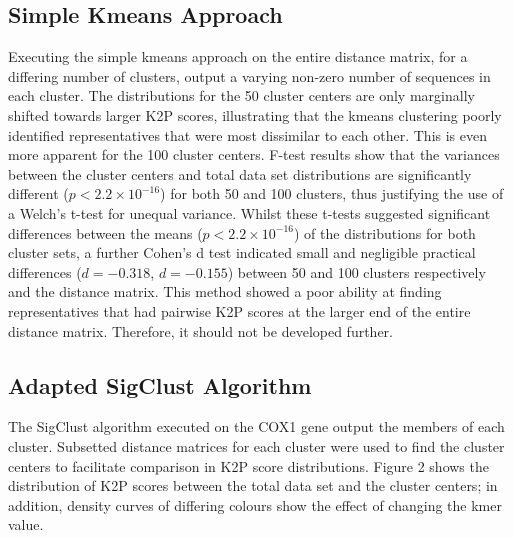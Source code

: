 \documentclass[12pt]{article}
\begin{document}
  \subsection{Simple Kmeans Approach}

  Executing the simple kmeans approach on the entire distance matrix, for a differing number of clusters, output a varying non-zero number of sequences in each cluster. The distributions for the 50 cluster centers are only marginally shifted towards larger K2P scores, illustrating that the kmeans clustering poorly identified representatives that were most dissimilar to each other. This is even more apparent for the 100 cluster centers. F-test results show that the variances between the cluster centers and total data set distributions are significantly different ($p < 2.2 \times 10^{-16}$) for both 50 and 100 clusters, thus justifying the use of a Welch's t-test for unequal variance. Whilst these t-tests suggested significant differences between the means ($p < 2.2 \times 10^{-16}$) of the distributions for both cluster sets, a further Cohen's d test indicated small and negligible practical differences ($d = -0.318$, $d = -0.155$) between 50 and 100 clusters respectively and the distance matrix. This method showed a poor ability at finding representatives that had pairwise K2P scores at the larger end of the entire distance matrix. Therefore, it should not be developed further.

  \subsection{Adapted SigClust Algorithm}

  The SigClust algorithm executed on the COX1 gene output the members of each cluster. Subsetted distance matrices for each cluster were used to find the cluster centers to facilitate comparison in K2P score distributions. Figure 2 shows the distribution of K2P scores between the total data set and the cluster centers; in addition, density curves of differing colours show the effect of changing the kmer value.
\end{document}
